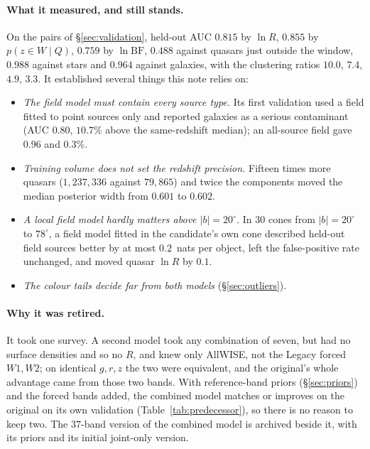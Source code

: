 \documentclass[11pt,a4paper]{article}
\begin{document}
\paragraph{What it measured, and still stands.} On the pairs of
\S\ref{sec:validation}, held-out AUC $0.815$ by $\ln R$, $0.855$ by
$p(z\in W\mid Q)$, $0.759$ by $\ln\mathrm{BF}$, $0.488$ against quasars just
outside the window, $0.988$ against stars and $0.964$ against galaxies, with the
clustering ratios $10.0$, $7.4$, $4.9$, $3.3$. It established several things this
note relies on:
\begin{itemize}
\item \emph{The field model must contain every source type.} Its first validation
used a field fitted to point sources only and reported galaxies as a serious
contaminant (AUC $0.80$, $10.7\%$ above the same-redshift median); an all-source
field gave $0.96$ and $0.3\%$.
\item \emph{Training volume does not set the redshift precision.} Fifteen times
more quasars ($1{,}237{,}336$ against $79{,}865$) and twice the components moved
the median posterior width from $0.601$ to $0.602$.
\item \emph{A local field model hardly matters above $|b|=20^\circ$.} In $30$
cones from $|b|=20^\circ$ to $78^\circ$, a field model fitted in the
candidate's own cone described held-out field sources better by at most
$0.2$~nats per object, left the false-positive rate unchanged, and moved quasar
$\ln R$ by $0.1$.

\item \emph{The colour tails decide far from both models} (\S\ref{sec:outliers}).
\end{itemize}

\paragraph{Why it was retired.} It took one survey. A second model took any
combination of seven, but had no surface densities and so no $R$, and knew only
AllWISE, not the Legacy forced $W1,W2$; on identical $g,r,z$ the two were
equivalent, and the original's whole advantage came from those two bands. With
reference-band priors (\S\ref{sec:priors}) and the forced bands added, the
combined model matches or improves on the original on its own validation
(Table~\ref{tab:predecessor}), so there is no reason to keep two. The
$37$-band version of the combined model is archived beside it, with its priors
and its initial joint-only version.
\end{document}
